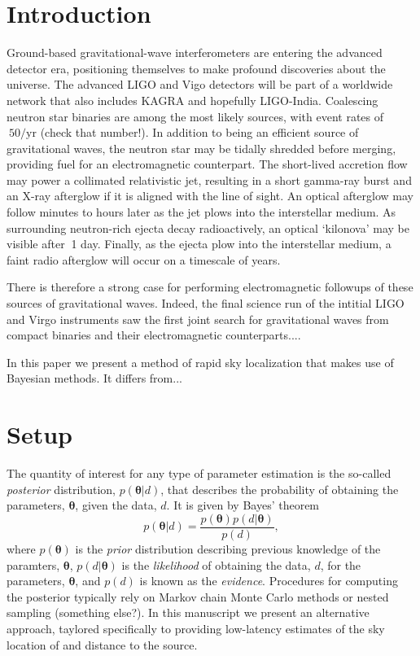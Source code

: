 \documentclass{iopart}
\begin{document}
\section{Introduction}

Ground-based gravitational-wave interferometers are entering the advanced detector era, positioning themselves to make profound discoveries about the universe.  The advanced LIGO and Vigo detectors will be part of a worldwide network that also includes KAGRA and hopefully LIGO-India.  Coalescing neutron star binaries are among the most likely sources, with event rates of $~ 50/\mathrm{yr}$ (check that number!).  In addition to being an efficient source of gravitational waves, the neutron star may be tidally shredded before merging, providing fuel for an electromagnetic counterpart.  The short-lived accretion flow may power a collimated relativistic jet, resulting in a short gamma-ray burst and an X-ray afterglow if it is aligned with the line of sight. An optical afterglow may follow minutes to hours later as the jet plows into the interstellar medium. As surrounding neutron-rich ejecta decay radioactively, an optical `kilonova' may be visible after $~$1 day. Finally, as the ejecta plow into the interstellar medium, a faint radio afterglow will occur on a timescale of years.

There is therefore a strong case for performing electromagnetic followups of these sources of gravitational waves.  Indeed, the final science run of the intitial LIGO and Virgo instruments saw the first joint search for gravitational waves from compact binaries and their electromagnetic counterparts....

In this paper we present a method of rapid sky localization that makes use of Bayesian methods.  It differs from...

\section{Setup}

The quantity of interest for any type of parameter estimation is the so-called {\it posterior} distribution, $p(\boldsymbol\theta|d)$, that describes the probability of obtaining the parameters, $\boldsymbol\theta$, given the data, $d$.  It is given by Bayes' theorem
\begin{equation}\label{bayes}
p(\boldsymbol\theta|d) = \frac{p(\boldsymbol\theta)p(d|\boldsymbol\theta)}{p(d)},
\end{equation}
where $p(\boldsymbol\theta)$ is the {\it prior} distribution describing previous knowledge of the paramters, $\boldsymbol\theta$, $p(d|\boldsymbol\theta)$ is the {\it likelihood} of obtaining the data, $d$, for the parameters, $\boldsymbol\theta$, and $p(d)$ is known as the {\it evidence}.  Procedures for computing the posterior typically rely on Markov chain Monte Carlo methods or nested sampling (something else?).  In this manuscript we present an alternative approach, taylored specifically to providing low-latency estimates of the sky location of and distance to the source.
\end{document}
